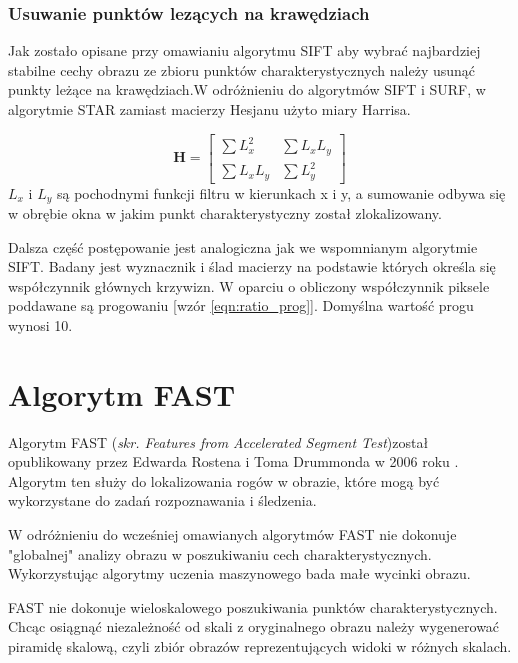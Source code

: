 \subsubsection{Usuwanie punktów lezących na krawędziach}
Jak zostało opisane przy omawianiu algorytmu SIFT aby wybrać najbardziej stabilne cechy obrazu ze zbioru punktów charakterystycznych należy usunąć punkty leżące na krawędziach.W odróżnieniu do algorytmów SIFT i SURF, w algorytmie STAR zamiast macierzy Hesjanu użyto miary Harrisa.

\begin{equation}
\textbf{H} = 
\left[\begin{array}{cc}
\sum L_{x}^2&\sum L_{x}L_{y}\\
\sum L_{x}L_{y}&\sum L_{y}^2
\end{array}\right]
\end{equation}
$L_{x}$ i $L_{y}$ są pochodnymi funkcji filtru w kierunkach x i y, a sumowanie odbywa się w obrębie okna w jakim punkt charakterystyczny został zlokalizowany.


Dalsza część postępowanie jest analogiczna jak we wspomnianym algorytmie SIFT. Badany jest wyznacznik i ślad macierzy na podstawie których określa się współczynnik głównych krzywizn. W oparciu o obliczony współczynnik piksele poddawane są progowaniu [wzór \ref{eqn:ratio_prog}]. Domyślna wartość progu wynosi 10.







\FloatBarrier
\newpage
\section{Algorytm FAST}
Algorytm FAST (\textit{skr. Features from Accelerated Segment Test})został opublikowany przez Edwarda Rostena i Toma Drummonda w 2006 roku \cite{rosten_2006_machine} \cite{rosten_2008_faster}.  Algorytm ten służy do lokalizowania rogów w obrazie, które mogą być wykorzystane do zadań rozpoznawania i śledzenia. 

W odróżnieniu do wcześniej omawianych algorytmów FAST nie dokonuje "globalnej" analizy obrazu w poszukiwaniu cech charakterystycznych. Wykorzystując algorytmy uczenia maszynowego bada małe wycinki obrazu.

FAST nie dokonuje wieloskalowego poszukiwania punktów charakterystycznych. Chcąc osiągnąć niezależność od skali z oryginalnego obrazu należy wygenerować piramidę skalową, czyli zbiór obrazów reprezentujących widoki w różnych skalach.

